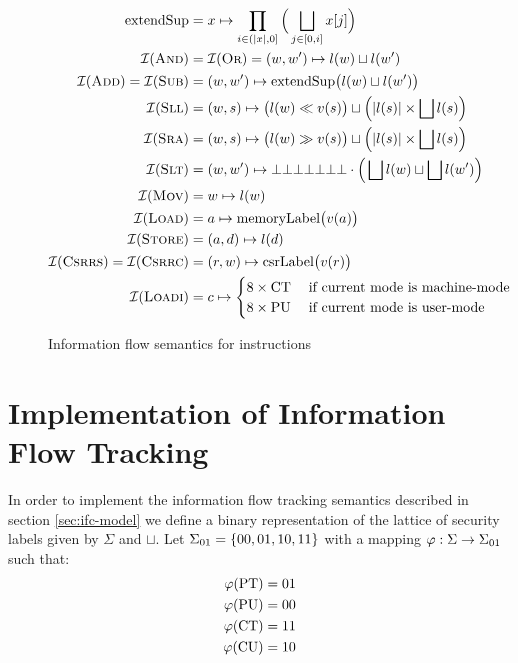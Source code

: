 \begin{figure}
    \begin{align*}
        \text{extendSup} &= x \mapsto \prod_{i \in (|x|, 0]} \Big( \bigsqcup_{j \in [0, i]} x[j] \Big) \\
        \mathcal{I}(\textsc{And}) &= \mathcal{I}(\textsc{Or}) = (w, w') \mapsto l(w) \sqcup l(w') \\
        \mathcal{I}(\textsc{Add}) = \mathcal{I}(\textsc{Sub}) &= (w, w') \mapsto \text{extendSup}\big(l(w) \sqcup l(w') \big) \\
        \mathcal{I}(\textsc{Sll}) &= (w, s) \mapsto \big(l(w) \ll v(s) \big) \sqcup \Big(|l(s)| \times \bigsqcup l(s) \Big) \\
        \mathcal{I}(\textsc{Sra}) &= (w, s) \mapsto \big(l(w) \gg v(s) \big) \sqcup \Big(|l(s)| \times \bigsqcup l(s) \Big) \\
        \mathcal{I}(\textsc{Slt}) &= (w, w') \mapsto \bot\bot\bot\bot\bot\bot\bot \cdot \Big(\bigsqcup l(w) \sqcup \bigsqcup l(w') \Big) \\
        \mathcal{I}(\textsc{Mov}) &= w \mapsto l(w) \\
        \mathcal{I}(\textsc{Load}) &= a \mapsto \text{memoryLabel}\big(v(a) \big) \\
        \mathcal{I}(\textsc{Store}) &= (a, d) \mapsto l(d) \\
        \mathcal{I}(\textsc{Csrrs}) = \mathcal{I}(\textsc{Csrrc}) &= (r, w) \mapsto \text{csrLabel}\big(v(r) \big) \\
        \mathcal{I}(\textsc{Loadi}) &= c \mapsto \begin{cases}
            8 \times \text{CT} & \; \text{if current mode is machine-mode} \\
            8 \times \text{PU} & \; \text{if current mode is user-mode}
        \end{cases}
    \end{align*}
    \caption{Information flow semantics for instructions}
    \label{fig:ifc-semantics}
\end{figure}

\section{Implementation of Information Flow Tracking}
\label{sec:ifc-implementation}

In order to implement the information flow tracking semantics described in section \ref{sec:ifc-model} we define a binary representation of the lattice of security labels given by $ \Sigma $ and $ \sqcup $.
Let $ \Sigma_{01} = \{ 00, 01, 10, 11 \}$ with a mapping $ \varphi : \Sigma \rightarrow \Sigma_{01} $ such that:
\begin{align*}
    \varphi(\text{PT}) &= 01 \\
    \varphi(\text{PU}) &= 00 \\
    \varphi(\text{CT}) &= 11 \\
    \varphi(\text{CU}) &= 10
\end{align*}

